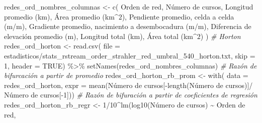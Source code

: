 \documentclass[spanish]{article}
\newenvironment{Shaded}{\begin{snugshade}}{\end{snugshade}}
\newcommand{\AttributeTok}[1]{\textcolor[rgb]{0.77,0.63,0.00}{#1}}
\newcommand{\CommentTok}[1]{\textcolor[rgb]{0.56,0.35,0.01}{\textit{#1}}}
\newcommand{\ConstantTok}[1]{\textcolor[rgb]{0.00,0.00,0.00}{#1}}
\newcommand{\DecValTok}[1]{\textcolor[rgb]{0.00,0.00,0.81}{#1}}
\newcommand{\FunctionTok}[1]{\textcolor[rgb]{0.00,0.00,0.00}{#1}}
\newcommand{\NormalTok}[1]{#1}
\newcommand{\OtherTok}[1]{\textcolor[rgb]{0.56,0.35,0.01}{#1}}
\newcommand{\SpecialCharTok}[1]{\textcolor[rgb]{0.00,0.00,0.00}{#1}}
\newcommand{\StringTok}[1]{\textcolor[rgb]{0.31,0.60,0.02}{#1}}
\begin{document}
\begin{Shaded}
\begin{Highlighting}[]
\NormalTok{redes\_ord\_nombres\_columnas }\OtherTok{\textless{}{-}} \FunctionTok{c}\NormalTok{(}
    \StringTok{\textquotesingle{}Orden de red\textquotesingle{}}\NormalTok{, }\StringTok{\textquotesingle{}Número de cursos\textquotesingle{}}\NormalTok{, }\StringTok{\textquotesingle{}Longitud promedio (km)\textquotesingle{}}\NormalTok{,}
    \StringTok{\textquotesingle{}Área promedio (km$\^{}2$)\textquotesingle{}}\NormalTok{, }\StringTok{\textquotesingle{}Pendiente promedio, celda a celda (m/m)\textquotesingle{}}\NormalTok{,}
    \StringTok{\textquotesingle{}Gradiente promedio, nacimiento a desembocadura (m/m)\textquotesingle{}}\NormalTok{,}
    \StringTok{\textquotesingle{}Diferencia de elevación promedio (m)\textquotesingle{}}\NormalTok{,}
    \StringTok{\textquotesingle{}Longitud total (km)\textquotesingle{}}\NormalTok{, }\StringTok{\textquotesingle{}Área total (km$\^{}2$)\textquotesingle{}}
\NormalTok{)}
\CommentTok{\# Horton}
\NormalTok{redes\_ord\_horton }\OtherTok{\textless{}{-}} \FunctionTok{read.csv}\NormalTok{(}
  \AttributeTok{file =} \StringTok{\textquotesingle{}estadisticos/stats\_rstream\_order\_strahler\_red\_umbral\_540\_horton.txt\textquotesingle{}}\NormalTok{,}
  \AttributeTok{skip =} \DecValTok{1}\NormalTok{, }\AttributeTok{header =} \ConstantTok{TRUE}\NormalTok{) }\SpecialCharTok{\%\textgreater{}\%} 
  \FunctionTok{setNames}\NormalTok{(redes\_ord\_nombres\_columnas)}
\CommentTok{\# Razón de bifurcación a partir de promedio}
\NormalTok{redes\_ord\_horton\_rb\_prom }\OtherTok{\textless{}{-}} \FunctionTok{with}\NormalTok{(}
  \AttributeTok{data =}\NormalTok{ redes\_ord\_horton,}
  \AttributeTok{expr =} \FunctionTok{mean}\NormalTok{(}\StringTok{\textasciigrave{}}\AttributeTok{Número de cursos}\StringTok{\textasciigrave{}}\NormalTok{[}\SpecialCharTok{{-}}\FunctionTok{length}\NormalTok{(}\StringTok{\textasciigrave{}}\AttributeTok{Número de cursos}\StringTok{\textasciigrave{}}\NormalTok{)]}\SpecialCharTok{/}
                \StringTok{\textasciigrave{}}\AttributeTok{Número de cursos}\StringTok{\textasciigrave{}}\NormalTok{[}\SpecialCharTok{{-}}\DecValTok{1}\NormalTok{]))}
\CommentTok{\# Razón de bifuración a partir de coeficientes de regresión}
\NormalTok{redes\_ord\_horton\_rb\_regr }\OtherTok{\textless{}{-}} \DecValTok{1}\SpecialCharTok{/}\DecValTok{10}\SpecialCharTok{\^{}}\FunctionTok{lm}\NormalTok{(}\FunctionTok{log10}\NormalTok{(}\StringTok{\textasciigrave{}}\AttributeTok{Número de cursos}\StringTok{\textasciigrave{}}\NormalTok{) }\SpecialCharTok{\textasciitilde{}} \StringTok{\textasciigrave{}}\AttributeTok{Orden de red}\StringTok{\textasciigrave{}}\NormalTok{,}

\end{Highlighting}
\end{Shaded}
\end{document}
